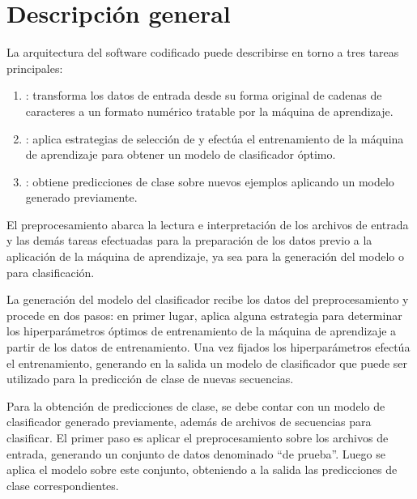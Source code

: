 %
%
%
\section{Descripción general}
%
La arquitectura del software codificado puede describirse en torno a
tres tareas principales:
%
\begin{enumerate}
\item
  :
  transforma los datos de entrada desde su forma original de cadenas
  de caracteres a un formato numérico tratable por la máquina de
  aprendizaje.
\item
  :
  aplica estrategias de selección de  y efectúa el
  entrenamiento de la máquina de aprendizaje para obtener un modelo
  de clasificador óptimo.
\item
  :
  obtiene predicciones de clase sobre nuevos ejemplos aplicando un
  modelo generado previamente.
\end{enumerate}
%
El preprocesamiento abarca la lectura e interpretación de los archivos
de entrada y las demás tareas efectuadas para la preparación de los
datos previo a la aplicación de la máquina de aprendizaje, ya sea para
la generación del modelo o para clasificación.


La generación del modelo del clasificador recibe los datos del
preprocesamiento y procede en dos pasos:
en primer lugar, aplica alguna estrategia para determinar los
hiperparámetros óptimos de entrenamiento de la máquina de aprendizaje
a partir de los datos de entrenamiento.
Una vez fijados los hiperparámetros efectúa el entrenamiento,
generando en la salida un modelo de clasificador que puede ser
utilizado para la predicción de clase de nuevas secuencias.


Para la obtención de predicciones de clase, se debe contar con un
modelo de clasificador generado previamente, además de archivos de
secuencias para clasificar.
El primer paso es aplicar el preprocesamiento sobre los archivos de
entrada, generando un conjunto de datos denominado ``de prueba''.
Luego se aplica el modelo sobre este conjunto, obteniendo a la salida
las predicciones de clase correspondientes.
